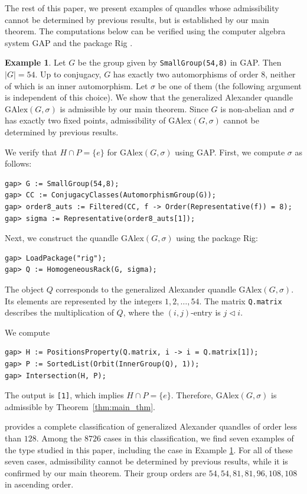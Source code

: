 \documentclass[dvipdfmx,12pt]{amsart}
\theoremstyle{plain}
\theoremstyle{definition}
\newtheorem{ex}[thm]{Example}
\newcommand{\qop}{\triangleleft}
\newcommand{\GAlex}{\mathrm{GAlex}}
\begin{document}
The rest of this paper, 
we present examples of quandles whose admissibility cannot be determined by previous results, but is established by our main theorem. The computations below can be verified using the computer algebra system GAP \cite{GAP4} and the package Rig \cite{Rig}.

\begin{ex}\label{ex:GAlex_admissible}
Let $G$ be the group given by \texttt{SmallGroup(54,8)} in GAP. Then $|G| = 54$. Up to conjugacy, $G$ has exactly two automorphisms of order $8$, neither of which is an inner automorphism. Let $\sigma$ be one of them (the following argument is independent of this choice). We show that the generalized Alexander quandle $\GAlex(G,\sigma)$ is admissible by our main theorem. Since $G$ is non-abelian and $\sigma$ has exactly two fixed points, admissibility of $\GAlex(G,\sigma)$ cannot be determined by previous results.

We verify that $H \cap P = \{e\}$ for $\GAlex(G,\sigma)$ using GAP. First, we compute $\sigma$ as follows:
\begin{verbatim}
gap> G := SmallGroup(54,8);
gap> CC := ConjugacyClasses(AutomorphismGroup(G));
gap> order8_auts := Filtered(CC, f -> Order(Representative(f)) = 8);
gap> sigma := Representative(order8_auts[1]);
\end{verbatim}

Next, we construct the quandle $\GAlex(G,\sigma)$ using the package Rig:
\begin{verbatim}
gap> LoadPackage("rig");
gap> Q := HomogeneousRack(G, sigma);
\end{verbatim}

The object $Q$ corresponds to the generalized Alexander quandle $\GAlex(G,\sigma)$. Its elements are represented by the integers $1,2,\dots,54$. 
The matrix \texttt{Q.matrix} describes the multiplication of $Q$, where the $(i,j)$-entry is $j \qop i$.

We compute
\begin{verbatim}
gap> H := PositionsProperty(Q.matrix, i -> i = Q.matrix[1]);
gap> P := SortedList(Orbit(InnerGroup(Q), 1));
gap> Intersection(H, P);
\end{verbatim}

The output is \texttt{[1]}, which implies $H \cap P = \{e\}$. Therefore, $\GAlex(G,\sigma)$ is admissible by Theorem~\ref{thm:main_thm}.
\end{ex}


\cite{Higashitani-2024-ClassificationGeneralizedAlexanderQuandlesa} provides a complete classification of generalized Alexander quandles of order less than $128$. Among the $8726$ cases in this classification, we find seven examples of the type studied in this paper, including the case in Example \ref{ex:GAlex_admissible}. 
For all of these seven cases, admissibility cannot be determined by previous results, while it is confirmed by our main theorem. Their group orders are $54, 54, 81, 81, 96, 108, 108$ in ascending order.
\end{document}
